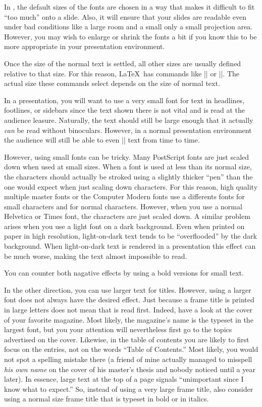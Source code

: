In \beamer, the default sizes of the fonts are chosen in a way that
makes it difficult to fit ``too much'' onto a slide. Also, it will
ensure that your slides are readable even under bad conditions like a
large room and a small only a small projection area. However, you may
wish to enlarge or shrink the fonts a bit if you know this to be more
appropriate in your presentation environment.

Once the size of the normal text is settled, all other sizes are
usually defined relative to that size. For this reason, \LaTeX\ has 
commands like |\large| or |\small|. The actual size these commands
select depends on the size of normal text.

In a presentation, you will want to use a very small font for text in
headlines, footlines, or sidebars since the text shown there is not
vital and is read at the audience leasure. Naturally, the text should
still be large enough that it actually \emph{can} be read without
binoculars. However, in a normal presentation environment the audience
will still be able to even |\tiny| text from time to time.

However, using small fonts can be tricky. Many PostScript fonts are
just scaled down when used at small sizes. When a font is
used at less than its normal size, the characters should actually be
stroked using a slightly thicker ``pen'' than the one would expect
when just scaling down characters. For this reason, high quality
multiple master fonts or the Computer Modern fonts use a differents
fonts for small characters and for normal characters. However, when
you use a normal Helvetica or Times font, the characters are just
scaled down. A similar problem arises when you use a light font on a
dark background. Even when printed on paper in high resolution,
light-on-dark text tends to be ``overflooded'' by the dark
background. When light-on-dark text is rendered in a presentation this
effect can be much worse, making the text almost impossible to read.

You can counter both nagative effects by using a bold versions for
small text.

In the other direction, you can use larger text for titles. However,
using a larger font does not always have the desired effect. Just
because a frame title is printed in large letters does not
mean that is read first. Indeed, have a look at the cover of your
favorite magazine. Most likely, the magazine's name is the typeset in the
largest font, but you your attention will nevertheless first go to the
topics advertised on the cover. Likewise, in the table of contents you
are likely to first focus on the entries, not on the words ``Table of
Contents.'' Most likely, you would not spot a spelling mistake there
(a friend of mine actually managed to misspell \emph{his own name} on
the cover of his master's thesis and nobody noticed until a year
later). In essence, large text at the top of a page signals
``unimportant since I know what to expect.'' So, instead of using a
very large frame title, also consider using a normal size frame title
that is typeset in bold or in italics. 





